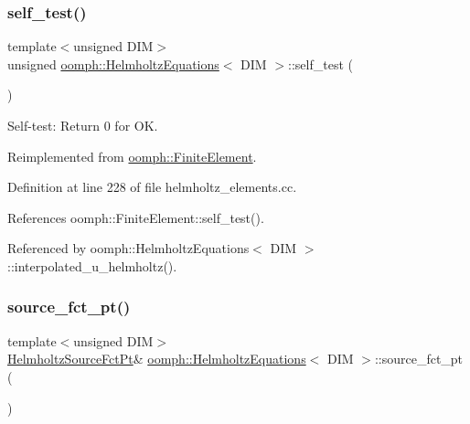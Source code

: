 \subsubsection{\texorpdfstring{self\+\_\+test()}{self\_test()}}
{\footnotesize\ttfamily template$<$unsigned D\+IM$>$ \\
unsigned \hyperlink{classoomph_1_1HelmholtzEquations}{oomph\+::\+Helmholtz\+Equations}$<$ D\+IM $>$\+::self\+\_\+test (\begin{DoxyParamCaption}{ }\end{DoxyParamCaption})\hspace{0.3cm}{\ttfamily [virtual]}}



Self-\/test\+: Return 0 for OK. 



Reimplemented from \hyperlink{classoomph_1_1FiniteElement_af94c5a5e22175d5420b33b3b79e46ed3}{oomph\+::\+Finite\+Element}.



Definition at line 228 of file helmholtz\+\_\+elements.\+cc.



References oomph\+::\+Finite\+Element\+::self\+\_\+test().



Referenced by oomph\+::\+Helmholtz\+Equations$<$ D\+I\+M $>$\+::interpolated\+\_\+u\+\_\+helmholtz().

\mbox{\label{classoomph_1_1HelmholtzEquations_a0889bb08c9279e7ab69cfd6ae2ff20d7}} 
\subsubsection{\texorpdfstring{source\+\_\+fct\+\_\+pt()}{source\_fct\_pt()}\hspace{0.1cm}{\footnotesize\ttfamily [1/2]}}
{\footnotesize\ttfamily template$<$unsigned D\+IM$>$ \\
\hyperlink{classoomph_1_1HelmholtzEquations_a630648023d91bba9ee9a900353a1ea58}{Helmholtz\+Source\+Fct\+Pt}\& \hyperlink{classoomph_1_1HelmholtzEquations}{oomph\+::\+Helmholtz\+Equations}$<$ D\+IM $>$\+::source\+\_\+fct\+\_\+pt (\begin{DoxyParamCaption}{ }\end{DoxyParamCaption})\hspace{0.3cm}{\ttfamily [inline]}}



